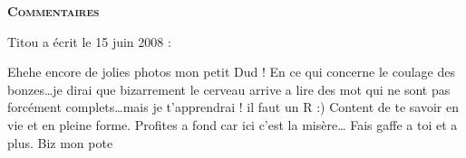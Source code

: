 \bigskip
\textbf{\textsc{Commentaires}}

\medskip
Titou a écrit le 15 juin 2008 :
\begin{displayquote}
Ehehe encore de jolies photos mon petit Dud !
En ce qui concerne le coulage des bonzes\dots je dirai que bizarrement le cerveau arrive a lire des mot qui ne sont pas forcément complets\dots mais je t'apprendrai ! il faut un R :) Content de te savoir en vie et en pleine forme. Profites a fond car ici c'est la misère\dots
Fais gaffe a toi et a plus.
Biz mon pote
\end{displayquote}

\vfill
